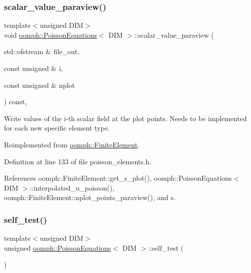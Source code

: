 \subsubsection{\texorpdfstring{scalar\+\_\+value\+\_\+paraview()}{scalar\_value\_paraview()}}
{\footnotesize\ttfamily template$<$unsigned D\+IM$>$ \\
void \hyperlink{classoomph_1_1PoissonEquations}{oomph\+::\+Poisson\+Equations}$<$ D\+IM $>$\+::scalar\+\_\+value\+\_\+paraview (\begin{DoxyParamCaption}\item[{std\+::ofstream \&}]{file\+\_\+out,  }\item[{const unsigned \&}]{i,  }\item[{const unsigned \&}]{nplot }\end{DoxyParamCaption}) const\hspace{0.3cm}{\ttfamily [inline]}, {\ttfamily [virtual]}}



Write values of the i-\/th scalar field at the plot points. Needs to be implemented for each new specific element type. 



Reimplemented from \hyperlink{classoomph_1_1FiniteElement_a02cf8832a5e2886f1572bd36f7a7c1e3}{oomph\+::\+Finite\+Element}.



Definition at line 133 of file poisson\+\_\+elements.\+h.



References oomph\+::\+Finite\+Element\+::get\+\_\+s\+\_\+plot(), oomph\+::\+Poisson\+Equations$<$ D\+I\+M $>$\+::interpolated\+\_\+u\+\_\+poisson(), oomph\+::\+Finite\+Element\+::nplot\+\_\+points\+\_\+paraview(), and s.

\mbox{\label{classoomph_1_1PoissonEquations_a04816974542e5764e1ec3f88d69b99ab}} 
\subsubsection{\texorpdfstring{self\+\_\+test()}{self\_test()}}
{\footnotesize\ttfamily template$<$unsigned D\+IM$>$ \\
unsigned \hyperlink{classoomph_1_1PoissonEquations}{oomph\+::\+Poisson\+Equations}$<$ D\+IM $>$\+::self\+\_\+test (\begin{DoxyParamCaption}{ }\end{DoxyParamCaption})\hspace{0.3cm}{\ttfamily [virtual]}}



